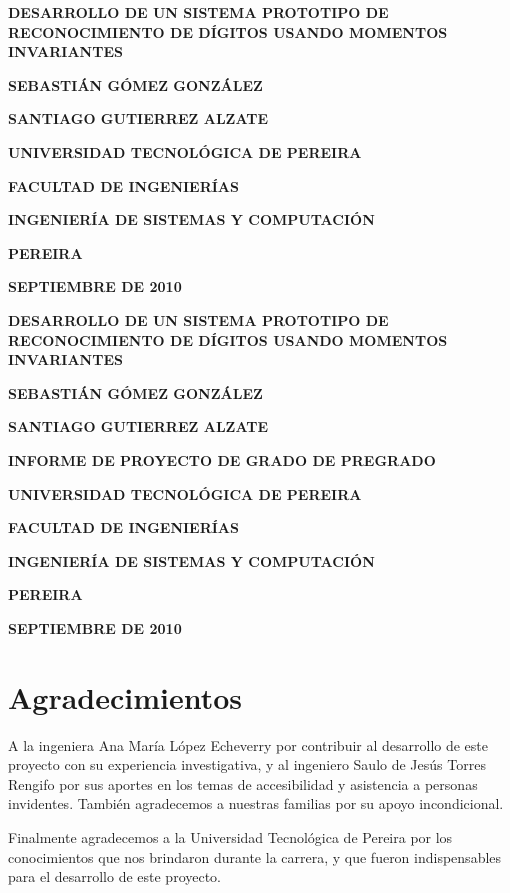 \documentclass[a4paper, 11pt, oneside]{report}
\newcommand\portada{
	\begin{titlepage}
		\begin{center}
			{\large \bf DESARROLLO DE UN SISTEMA PROTOTIPO DE RECONOCIMIENTO DE DÍGITOS USANDO MOMENTOS INVARIANTES }
			\vfill
			{\large\bf SEBASTIÁN GÓMEZ GONZÁLEZ \par}
			{\large\bf SANTIAGO GUTIERREZ ALZATE \par}
			\vfill
			{\large\bf UNIVERSIDAD TECNOLÓGICA DE PEREIRA  \par}
			{\large\bf FACULTAD DE INGENIERÍAS \par}
			{\large\bf INGENIERÍA DE SISTEMAS Y COMPUTACIÓN \par}
			{\large\bf PEREIRA\par}
			{\large\bf SEPTIEMBRE DE 2010 \par}
		\end{center}
	\end{titlepage}
	\clearpage
}
\newcommand\contraportada{
	\begin{titlepage}
		\begin{center}
			{\large \bf DESARROLLO DE UN SISTEMA PROTOTIPO DE RECONOCIMIENTO DE DÍGITOS USANDO MOMENTOS INVARIANTES }
			\vfill
			{\large\bf SEBASTIÁN GÓMEZ GONZÁLEZ \par}
			{\large\bf SANTIAGO GUTIERREZ ALZATE \par}
			\vfill
			{\large\bf INFORME DE PROYECTO DE GRADO DE PREGRADO\par}
			\vfill
			{\large\bf UNIVERSIDAD TECNOLÓGICA DE PEREIRA  \par}
			{\large\bf FACULTAD DE INGENIERÍAS \par}
			{\large\bf INGENIERÍA DE SISTEMAS Y COMPUTACIÓN \par}
			{\large\bf PEREIRA\par}
			{\large\bf SEPTIEMBRE DE 2010 \par}
		\end{center}
	\end{titlepage}
	\clearpage
}
\begin{document}
\portada

\contraportada


\chapter*{Agradecimientos}

A la ingeniera Ana María López Echeverry por contribuir al desarrollo de este proyecto con su experiencia investigativa, y al ingeniero Saulo de Jesús Torres Rengifo por sus aportes en los temas de accesibilidad y asistencia a personas invidentes. También agradecemos a nuestras familias por su apoyo incondicional.

Finalmente agradecemos a la Universidad Tecnológica de Pereira por los conocimientos que nos brindaron durante la carrera, y que fueron indispensables para el desarrollo de este proyecto.

\tableofcontents

\listoftables

\listoffigures
\end{document}
